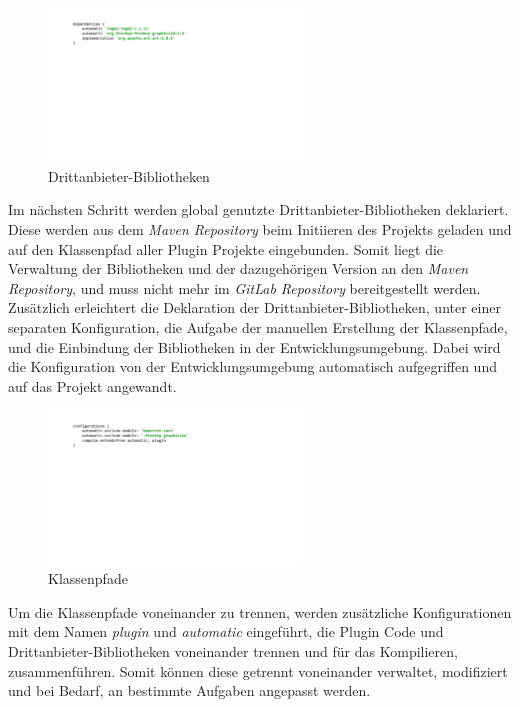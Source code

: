 	\begin{figure}[h!]
	  \centering
	  \includegraphics[width=0.6\textwidth]{material/images/gradle/dependencies.pdf}
	  \caption{Drittanbieter-Bibliotheken}
	  \label{fig:deps}
	\end{figure}

 	Im nächsten Schritt werden global genutzte Drittanbieter-Bibliotheken deklariert. Diese werden aus dem \textit{Maven Repository} beim Initiieren des Projekts geladen und auf den Klassenpfad aller Plugin Projekte eingebunden. Somit liegt die Verwaltung der Bibliotheken und der dazugehörigen Version an den \textit{Maven Repository}, und muss nicht mehr im \textit{GitLab Repository} bereitgestellt werden.\newline
 	Zusätzlich erleichtert die Deklaration der Drittanbieter-Bibliotheken, unter einer separaten Konfiguration, die Aufgabe der manuellen Erstellung der Klassenpfade, und die Einbindung der Bibliotheken in der Entwicklungsumgebung. Dabei wird die Konfiguration von der Entwicklungsumgebung automatisch aufgegriffen und auf das Projekt angewandt.\bigbreak

	\begin{figure}[h!]
	  \centering
	  \includegraphics[width=0.6\textwidth]{material/images/gradle/configurations.pdf}
	  \caption{Klassenpfade}
	  \label{fig:kPath}
	\end{figure}

 	Um die Klassenpfade voneinander zu trennen, werden zusätzliche Konfigurationen mit dem Namen \textit{plugin} und \textit{automatic} eingeführt, die Plugin Code und Drittanbieter-Bibliotheken voneinander trennen und für das Kompilieren, zusammenführen. Somit können diese getrennt voneinander verwaltet, modifiziert und bei Bedarf, an bestimmte Aufgaben angepasst werden.\bigbreak

